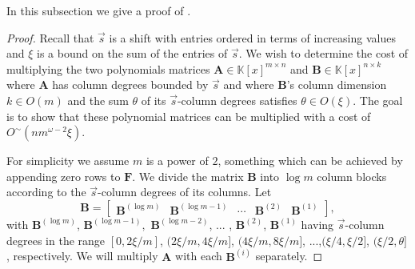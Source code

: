 In this subsection we give a proof of .
\begin{proof}
Recall that $\vec{s}$ is a shift with entries ordered in terms of
increasing values and $\xi$ is a bound on the sum of the entries
of $\vec{s}$. We wish to determine the cost of multiplying the two
polynomials matrices $\mathbf{A}\in\mathbb{K}\left[x\right]^{m\times n}$
and $\mathbf{B}\in\mathbb{K}\left[x\right]^{n\times k}$ where $\mathbf{A}$
has column degrees bounded by $\vec{s}$ and where $\mathbf{B}$'s
column dimension $k\in O\left(m\right)$ and the sum $\theta$ of
its $\vec{s}$-column degrees satisfies $\theta\in O\left(\xi\right)$.
The goal is to show that these polynomial matrices can be multiplied
with a cost of $O^{\sim}(nm^{\omega-2}\xi)$.

For simplicity we assume $m$ is a power of $2$, something which
can be achieved by appending zero rows to $\mathbf{F}$. We divide
the matrix $\mathbf{B}$ into $\log m$ column blocks according to
the $\vec{s}$-column degrees of its columns. Let 
\[
\mathbf{B}=\left[\begin{array}{ccccc}
\mathbf{B}^{\left(\log m\right)} & \mathbf{B}^{\left(\log m-1\right)} & \cdots & \mathbf{B}^{\left(2\right)} & \mathbf{B}^{\left(1\right)}\end{array}\right],
\]
 with $\mathbf{B}^{\left(\log m\right)}$, $\mathbf{B}^{\left(\log m-1\right)},$
$\mathbf{B}^{\left(\log m-2\right)}$, ... , $\mathbf{B}^{\left(2\right)}$,
$\mathbf{B}^{\left(1\right)}$ having $\vec{s}$-column degrees in
the range $\left[0,2\xi/m\right]$, $(2\xi/m,4\xi/m]$, $(4\xi/m,8\xi/m]$,
...,$(\xi/4,\xi/2]$, $(\xi/2,\theta]$, respectively. We will multiply
$\mathbf{A}$ with each $\mathbf{B}^{\left(i\right)}$ separately.


\end{proof}
